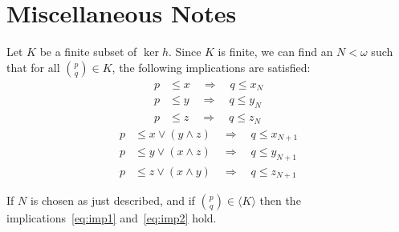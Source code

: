\newpage

\section{Miscellaneous Notes}
\noindent Let $K$ be a finite subset of $\ker h$.  Since $K$ is finite, we can find an $N < \omega$ such that for all $\binom{p}{q} \in K$, the following implications are satisfied:
\begin{align}
p &\leqslant x \quad \Longrightarrow \quad q \leqslant x_N\nonumber\\
p &\leqslant y \quad \Longrightarrow \quad q \leqslant y_N\label{eq:imp1}\\
p &\leqslant z \quad \Longrightarrow \quad q \leqslant z_N\nonumber
\end{align}
\begin{align}
p &\leqslant x \vee (y \wedge z) \quad \Longrightarrow \quad q \leqslant x_{N+1}\nonumber\\
p &\leqslant y \vee (x \wedge z) \quad \Longrightarrow \quad q \leqslant y_{N+1}\label{eq:imp2}\\
p &\leqslant z \vee (x \wedge y) \quad \Longrightarrow \quad q \leqslant z_{N+1}\nonumber
\end{align}

\medskip

 If $N$ is chosen as just described, and if $\binom{p}{q} \in \langle K \rangle$ then the implications~\ref{eq:imp1} and~\ref{eq:imp2} hold.

